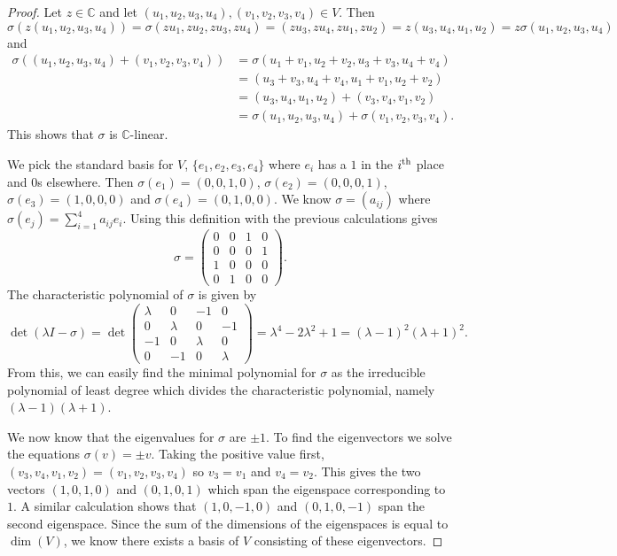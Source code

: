 \documentclass{article}
\renewcommand{\th}{^{\textup{th}}}
\begin{document}
\begin{proof}
Let $z \in \mathbb{C}$ and let $(u_1, u_2, u_3, u_4), (v_1, v_2, v_3, v_4) \in V$. Then
\[
\sigma(z(u_1, u_2, u_3, u_4)) = \sigma(zu_1, zu_2, zu_3, zu_4) = (zu_3, zu_4, zu_1, zu_2) = z(u_3, u_4, u_1, u_2) = z \sigma(u_1, u_2, u_3, u_4)
\]
and
\begin{align*}
\sigma((u_1, u_2, u_3, u_4) + (v_1, v_2, v_3, v_4))
&= \sigma(u_1 + v_1, u_2 + v_2, u_3 + v_3, u_4 + v_4)\\
&= (u_3 + v_3, u_4 + v_4, u_1 + v_1, u_2 + v_2)\\
&= (u_3, u_4, u_1, u_2) + (v_3, v_4, v_1, v_2)\\
&= \sigma(u_1, u_2, u_3, u_4) + \sigma(v_1, v_2, v_3, v_4).
\end{align*}
This shows that $\sigma$ is $\mathbb{C}$-linear.

We pick the standard basis for $V$, $\{e_1, e_2, e_3, e_4\}$ where $e_i$ has a $1$ in the $i\th$ place and $0$s elsewhere. Then $\sigma(e_1) = (0,0,1,0)$, $\sigma(e_2) = (0,0,0,1)$, $\sigma(e_3) = (1,0,0,0)$ and $\sigma(e_4) = (0,1,0,0)$. We know $\sigma = (a_{ij})$ where $\sigma(e_j) = \sum_{i=1}^{4} a_{ij}e_i$. Using this definition with the previous calculations gives
\[
\sigma =
\left (
\begin{array}{cccc}
0 & 0 & 1 & 0\\
0 & 0 & 0 & 1\\
1 & 0 & 0 & 0\\
0 & 1 & 0 & 0
\end{array}
\right ).
\]
The characteristic polynomial of $\sigma$ is given by
\[
\det(\lambda I - \sigma) = \det
\left (
\begin{array}{cccc}
\lambda & 0 & -1 & 0\\
0 & \lambda & 0 & -1\\
-1 & 0 & \lambda & 0\\
0 & -1 & 0 & \lambda
\end{array}
\right )
= \lambda^4 - 2\lambda^2 + 1 = (\lambda - 1)^2 (\lambda + 1)^2.
\]
From this, we can easily find the minimal polynomial for $\sigma$ as the irreducible polynomial of least degree which divides the characteristic polynomial, namely $(\lambda - 1)(\lambda + 1)$.

We now know that the eigenvalues for $\sigma$ are $\pm 1$. To find the eigenvectors we solve the equations $\sigma(v) = \pm v$. Taking the positive value first, $(v_3, v_4, v_1, v_2) = (v_1, v_2, v_3, v_4)$ so $v_3 = v_1$ and $v_4 = v_2$. This gives the two vectors $(1, 0, 1, 0)$ and $(0, 1, 0, 1)$ which span the eigenspace corresponding to $1$. A similar calculation shows that $(1, 0, -1, 0)$ and $(0, 1, 0, -1)$ span the second eigenspace. Since the sum of the dimensions of the eigenspaces is equal to $\dim (V)$, we know there exists a basis of $V$ consisting of these eigenvectors.
\end{proof}
\end{document}
